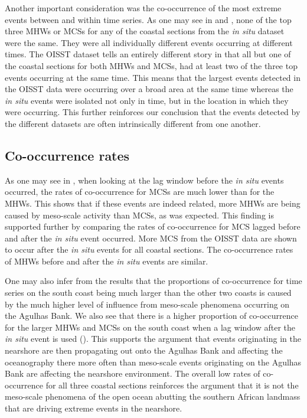 \documentclass[a4paper,10pt,review]{elsarticle}
\begin{document}
Another important consideration was the co-occurrence of the most extreme events between and within time series. As one may see in  and , none of the top three MHWs or MCSs for any of the coastal sections from the \emph{in situ} dataset were the same. They were all individually different events occurring at different times. The OISST dataset tells an entirely different story in that all but one of the coastal sections for both MHWs and MCSs, had at least two of the three top events occurring at the same time. This means that the largest events detected in the OISST data were occurring over a broad area at the same time whereas the \emph{in situ} events were isolated not only in time, but in the location in which they were occurring. This further reinforces our conclusion that the events detected by the different datasets are often intrinsically different from one another.

\subsection{Co-occurrence rates}
As one may see in , when looking at the lag window before the \emph{in situ} events occurred, the rates of co-occurrence for MCSs are much lower than for the MHWs. This shows that if these events are indeed related, more MHWs are being caused by meso-scale activity than MCSs, as was expected. This finding is supported further by comparing the rates of co-occurrence for MCS lagged before and after the \emph{in situ} event occurred. More MCS from the OISST data are shown to occur after the \emph{in situ} events for all coastal sections. The co-occurrence rates of MHWs before and after the \emph{in situ} events are similar.

One may also infer from the results that the proportions of co-occurrence for time series on the south coast being much larger than the other two coasts is caused by the much higher level of influence from meso-scale phenomena occurring on the Agulhas Bank. We also see that there is a higher proportion of co-occurrence for the larger MHWs and MCSs on the south coast when a lag window after the \emph{in situ} event is used (). This supports the argument that events originating in the nearshore are then propagating out onto the Agulhas Bank and affecting the oceanography there more often than meso-scale events originating on the Agulhas Bank are affecting the nearshore environment. The overall low rates of co-occurrence for all three coastal sections reinforces the argument that it is not the meso-scale phenomena of the open ocean abutting the southern African landmass that are driving extreme events in the nearshore.
\end{document}

